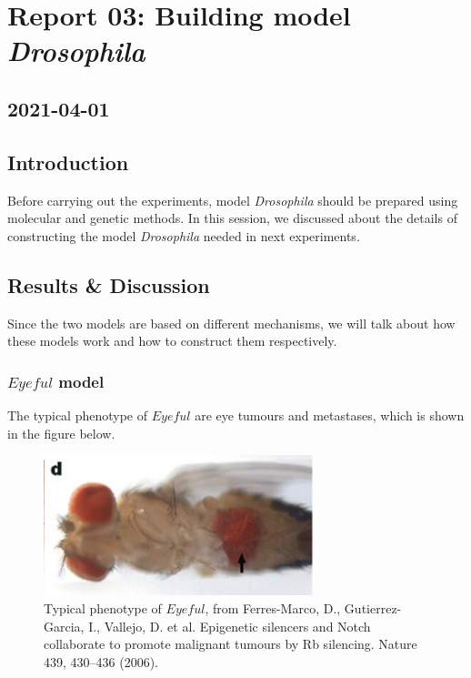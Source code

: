 \newpage
\section{Report 03: Building model \textit{Drosophila}}

\subsection*{2021-04-01}

\subsection{Introduction}
Before carrying out the experiments, model \textit{Drosophila} should be prepared using molecular and genetic methods. In this session, we discussed about the details of constructing the model \textit{Drosophila} needed in next experiments.


\subsection{Results \& Discussion}
Since the two models are based on different mechanisms, we will talk about how these models work and how to construct them respectively.

\subsubsection{$Eyeful$ model}
The typical phenotype of $Eyeful$ are eye tumours and metastases, which is shown in the figure below.\cite{ferres2006epigenetic}
\begin{figure}[H]
    \centering
    \includegraphics[width=0.7\textwidth]{image/eyeful_phenotype.png}
    \caption{Typical phenotype of $Eyeful$, from Ferres-Marco, D., Gutierrez-Garcia, I., Vallejo, D. et al. Epigenetic silencers and Notch collaborate to promote malignant tumours by Rb silencing. Nature 439, 430–436 (2006).}
    \label{eyeful_phenotype}
\end{figure}

